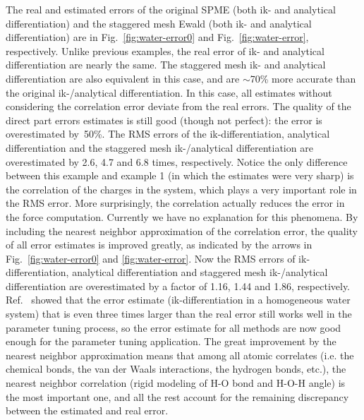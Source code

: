 \documentclass[aps,pre,preprint]{revtex4}
\begin{document}
The real and estimated errors of the original SPME
(both ik- and analytical differentiation)
and the staggered mesh Ewald (both ik- and analytical differentiation)
are in Fig.~\ref{fig:water-error0}
and Fig.~\ref{fig:water-error}, respectively.
Unlike previous examples, the real error of ik- and analytical differentiation
are nearly the same.
The staggered mesh ik- and analytical differentiation
are also equivalent in this case, and are $\sim$70\% more accurate
than the original ik-/analytical differentiation.
In this case,
all estimates without considering the correlation error
deviate from the real errors.
The quality of the direct
part errors estimates is still good (though not perfect):
the error is overestimated by~50\%.
The RMS errors of the ik-differentiation, analytical differentiation
and the staggered mesh ik-/analytical differentiation are
overestimated by 2.6, 4.7 and 6.8 times, respectively.
Notice the only difference between this example
and example 1 (in which the estimates were very sharp) is the correlation
of the charges in the system,
which plays a very important role in the RMS error. 
More surprisingly, the correlation
actually  reduces the error in the force computation.
Currently we have no explanation for this phenomena.
By including the nearest neighbor approximation of the
correlation error, the quality of all error estimates is improved greatly,
as indicated by the arrows in Fig.~\ref{fig:water-error0} and \ref{fig:water-error}.
Now the RMS errors of ik-differentiation, analytical differentiation
and staggered mesh ik-/analytical differentiation
are overestimated by a factor of 1.16, 1.44 and 1.86,
respectively.
Ref.~\cite{wang2010optimizing} showed that the error estimate
(ik-differentiation in a homogeneous water system) that
is even three times larger than the real error
still works well in the parameter tuning process, 
so the error estimate for  all methods are now good enough
for the parameter tuning application.
The great improvement by the nearest neighbor approximation 
means that  among all atomic
correlates (i.e. the chemical bonds, the van der Waals interactions,
the hydrogen bonds, etc.), the nearest neighbor correlation (rigid
modeling of H-O bond and H-O-H angle)
is the most important one, and all
the rest account for the remaining discrepancy between the estimated and real
error.
\end{document}
